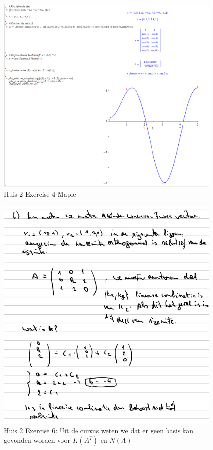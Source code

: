 \documentclass[a4paper]{report}
\begin{document}
\begin{figure}[H]
	\centering
	\includegraphics[width=\textwidth]{images/huis_2_maple_4.png}
	\caption{Huis 2 Exercise 4 Maple}
	\label{fig:huis_2_ex_4_maple}
\end{figure}

\begin{figure}[H]
	\centering
	\includegraphics[width=\textwidth]{images/huis_2_6.png}
	\caption{Huis 2 Exercise 6: Uit de cursus weten we dat er geen basis kan gevonden worden voor $K(A^T)$ en $N(A)$}
	\label{fig:huis_2_ex_6}
\end{figure}
\end{document}
